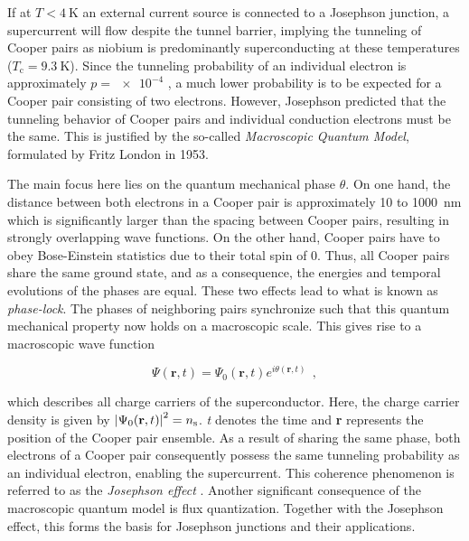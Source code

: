 If at $T < \qty{4}{\kelvin}$ an external current source is connected to a Josephson junction, a supercurrent will flow despite the tunnel barrier, implying the tunneling of Cooper pairs as niobium is predominantly superconducting at these temperatures ($T_\mathrm{c} = \qty{9.3}{\kelvin}$). Since the tunneling probability of an individual electron is approximately $p = \num{e-4}$ \cite{Gross2016}, a much lower probability is to be expected for a Cooper pair consisting of two electrons. However, Josephson predicted that the tunneling behavior of Cooper pairs and individual conduction electrons must be the same. This is justified by the so-called \textit{Macroscopic Quantum Model}, formulated by Fritz London in 1953.

The main focus here lies on the quantum mechanical phase $\theta$. On one hand, the distance between both electrons in a Cooper pair is approximately 10 to \qty{1000}{\nm} which is significantly larger than the spacing between Cooper pairs, resulting in strongly overlapping wave functions. On the other hand, Cooper pairs have to obey Bose-Einstein statistics due to their total spin of 0. Thus, all Cooper pairs share the same ground state, and as a consequence, the energies and temporal evolutions of the phases are equal. These two effects lead to what is known as \textit{phase-lock}. The phases of neighboring pairs synchronize such that this quantum mechanical property now holds on a macroscopic scale. This gives rise to a macroscopic wave function

\begin{equation}
\Psi(\textbf{r},t) = \Psi_0(\textbf{r},t)e^{i\theta(\textbf{r},t)} \ \ ,
\end{equation}

which describes all charge carriers of the superconductor. Here, the charge carrier density is given by $\left|\Psi_0(\textbf{r},t)\right|^2 = n_{\rm s}$. \textit{t} denotes the time and \textbf{r} represents the position of the Cooper pair ensemble. As a result of sharing the same phase, both electrons of a Cooper pair consequently possess the same tunneling probability as an individual electron, enabling the supercurrent. This coherence phenomenon is referred to as the \textit{Josephson effect} \cite{Josephson1962}. Another significant consequence of the macroscopic quantum model is flux quantization. Together with the Josephson effect, this forms the basis for Josephson junctions and their applications. 


